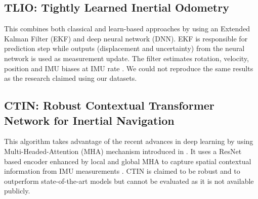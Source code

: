 \subsection{TLIO: Tightly Learned Inertial Odometry}
This combines both classical and learn-based approaches by using an Extended Kalman Filter (EKF) and deep neural network (DNN). EKF is responsible for prediction step while outputs (displacement and uncertainty) from the neural network is used as measurement update. The filter estimates rotation, velocity, position and IMU biases at IMU rate \citep{hol2009tightly}. We could not reproduce the same results as the research claimed using our datasets.

\subsection{CTIN: Robust Contextual Transformer Network for Inertial Navigation}
This algorithm takes advantage of the recent advances in deep learning by using Multi-Headed-Attention (MHA) mechanism introduced in \citep{vaswani2017attention}. It uses a ResNet based encoder enhanced by local and global MHA to capture spatial contextual information from IMU measurements \citep{rao2022ctin}. CTIN is claimed to be robust and to outperform state-of-the-art models but cannot be evaluated as it is not available publicly.



